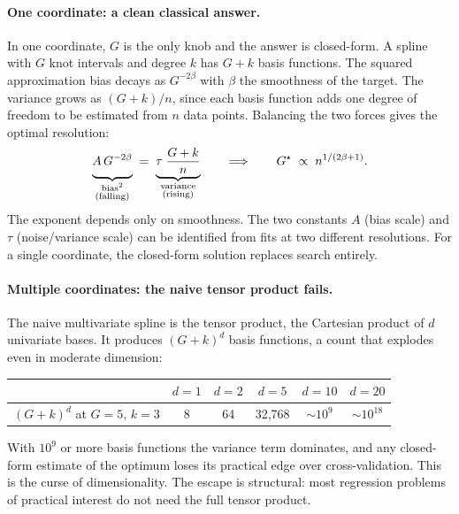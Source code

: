 \documentclass{article}
\begin{document}
\paragraph{One coordinate: a clean classical answer.}
In one coordinate, $G$ is the only knob and the answer is closed-form. A spline with $G$ knot intervals and degree $k$ has $G + k$ basis functions. The squared approximation bias decays as $G^{-2\beta}$ with $\beta$ the smoothness of the target. The variance grows as $(G + k) / n$, since each basis function adds one degree of freedom to be estimated from $n$ data points. Balancing the two forces gives the optimal resolution:
\[
\underbrace{A\, G^{-2\beta}\vphantom{\dfrac{G + k}{n}}}_{\substack{\text{bias}^2 \\ \text{(falling)}}}
\;=\;
\underbrace{\tau\;\dfrac{G + k}{n}}_{\substack{\text{variance} \\ \text{(rising)}}}
\qquad\Longrightarrow\qquad
G^\star \;\propto\; n^{1 / (2\beta + 1)}.
\]
The exponent depends only on smoothness. The two constants $A$ (bias scale) and $\tau$ (noise/variance scale) can be identified from fits at two different resolutions. For a single coordinate, the closed-form solution replaces search entirely.

\paragraph{Multiple coordinates: the naive tensor product fails.}
The naive multivariate spline is the tensor product, the Cartesian product of $d$ univariate bases. It produces $(G + k)^d$ basis functions, a count that explodes even in moderate dimension:
\smallskip
\begin{center}
\small
\begin{tabular}{@{}lccccc@{}}
\toprule
 & $d=1$ & $d=2$ & $d=5$ & $d=10$ & $d=20$ \\
\midrule
$(G+k)^d$ at $G=5,\,k=3$ & 8 & 64 & 32{,}768 & $\sim 10^9$ & $\sim 10^{18}$ \\
\bottomrule
\end{tabular}
\end{center}
\smallskip

\noindent With $10^9$ or more basis functions the variance term dominates, and any closed-form estimate of the optimum loses its practical edge over cross-validation. This is the curse of dimensionality. The escape is structural: most regression problems of practical interest do not need the full tensor product.
\end{document}
